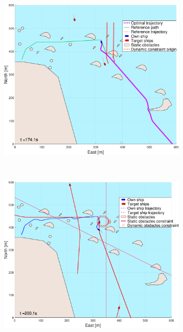 \begin{figure}[ht]
\begin{subfigure}[b]{0.494\textwidth}
        \subcaption{}
    \end{subfigure}
    \hfill
    \begin{subfigure}[b]{0.494\textwidth}
        \centering
        \includegraphics[width=\textwidth]{Images/NewFigures/skjergard_m_trafikk_NEW/_Simple_0fig999_time=175}
        \subcaption{}
    \end{subfigure}
    \hfill
    \\
    \begin{subfigure}[b]{0.494\textwidth}
        \centering
        \includegraphics[width=\textwidth]{Images/NewFigures/skjergard_m_trafikk_NEW/_Simple_0fig1_time=201}

\end{subfigure}
\end{figure}
